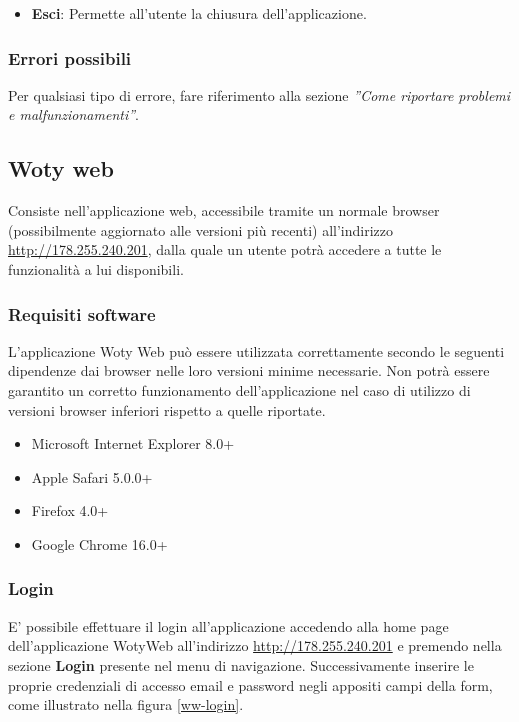 \begin{itemize}
\ \
\item \textbf{Esci}:
Permette all'utente la chiusura dell'applicazione.


\end{itemize}





\subsubsection{Errori possibili}
Per qualsiasi tipo di errore, fare riferimento alla sezione \emph{''Come riportare problemi e malfunzionamenti''}.


\newpage
\subsection{Woty web}
\label{ww}
Consiste nell'applicazione web, accessibile tramite un normale browser (possibilmente aggiornato alle versioni più recenti) all'indirizzo \url{http://178.255.240.201}, dalla quale un utente potrà accedere a tutte le funzionalità a lui disponibili.


\subsubsection{Requisiti software}
L'applicazione Woty Web può essere utilizzata correttamente secondo le seguenti dipendenze dai browser nelle loro versioni minime necessarie. Non potrà essere garantito un corretto funzionamento dell'applicazione nel caso di utilizzo di versioni browser inferiori rispetto a quelle riportate.

\begin{itemize}
\item Microsoft Internet Explorer 8.0+
\item Apple Safari 5.0.0+
\item Firefox 4.0+
\item Google Chrome 16.0+
\end{itemize}


\subsubsection{Login}
E' possibile effettuare il login all'applicazione accedendo alla home page dell'applicazione WotyWeb all'indirizzo \url{http://178.255.240.201} e premendo nella sezione \textbf{Login} presente nel menu di navigazione. Successivamente inserire le proprie credenziali di accesso email e password negli appositi campi della form, come illustrato nella figura \ref{ww-login}.

